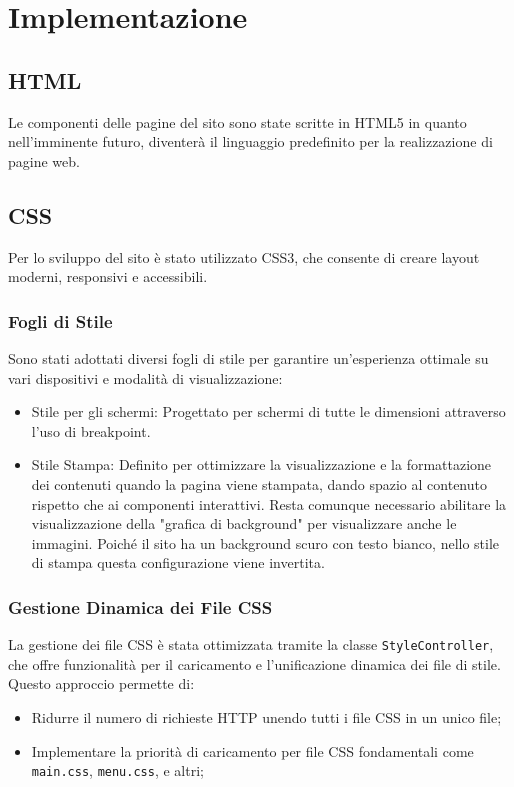 \section{Implementazione}
\subsection{HTML}
Le componenti delle pagine del sito sono state scritte in HTML5 in quanto nell'imminente futuro, diventer\`a il linguaggio predefinito per la realizzazione di pagine web.

\subsection{CSS}
Per lo sviluppo del sito \`e stato utilizzato CSS3, che consente di creare layout moderni, responsivi e accessibili.
\subsubsection{Fogli di Stile}
Sono stati adottati diversi fogli di stile per garantire un’esperienza ottimale su vari dispositivi e modalità di visualizzazione:
\begin{itemize}
\item Stile per gli schermi: Progettato per schermi di tutte le dimensioni attraverso l'uso di breakpoint.
\item Stile Stampa: Definito per ottimizzare la visualizzazione e la formattazione dei contenuti quando la pagina viene stampata, dando spazio al contenuto rispetto che ai componenti interattivi. Resta comunque necessario abilitare la visualizzazione della "grafica di background" per visualizzare anche le immagini. Poiché il sito ha un background scuro con testo bianco, nello stile di stampa questa configurazione viene invertita.
\end{itemize}

\subsubsection{Gestione Dinamica dei File CSS}
La gestione dei file CSS \`e stata ottimizzata tramite la classe \texttt{StyleController}, che offre funzionalit\`a per il caricamento e l'unificazione dinamica dei file di stile. Questo approccio permette di:
\begin{itemize}
\item Ridurre il numero di richieste HTTP unendo tutti i file CSS in un unico file;
\item Implementare la priorit\`a di caricamento per file CSS fondamentali come \texttt{main.css}, \texttt{menu.css}, e altri;
\end{itemize}

